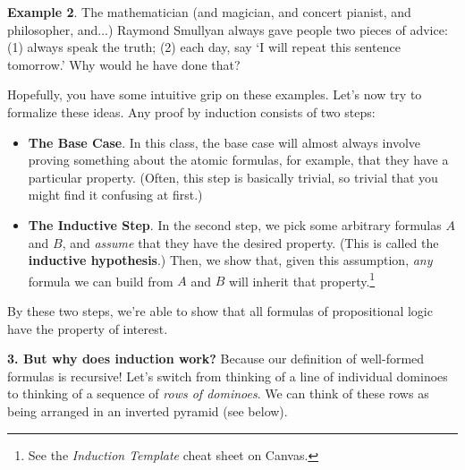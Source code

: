 \documentclass[options]{philosophersimprint}
\begin{document}
\textbf{Example 2}. The mathematician (and magician, and concert pianist, and philosopher, and...) Raymond Smullyan always gave people two pieces of advice: (1) always speak the truth; (2) each day, say `I will repeat this sentence tomorrow.' Why would he have done that?

Hopefully, you have some intuitive grip on these examples. Let's now try to formalize these ideas. Any proof by induction consists of two steps:
\begin{itemize}
    \item[] \textbf{The Base Case}. In this class, the base case will almost always involve proving something about the atomic formulas, for example, that they have a particular property. (Often, this step is basically trivial, so trivial that you might find it confusing at first.)
    \item[] \textbf{The Inductive Step}. In the second step, we pick some arbitrary formulas $A$ and $B$, and \textit{assume} that they have the desired property. (This is called the \textbf{inductive hypothesis}.) Then, we show that, given this assumption, \textit{any} formula we can build from $A$ and $B$ will inherit that property.\footnote{See the \textit{Induction Template} cheat sheet on Canvas.}
\end{itemize}
By these two steps, we're able to show that all formulas of propositional logic have the property of interest.

\textbf{3. But why does induction work?} Because our definition of well-formed formulas is recursive! Let's switch from thinking of a line of individual dominoes to thinking of a sequence of \textit{rows of dominoes}. We can think of these rows as being arranged in an inverted pyramid (see below).
\end{document}
